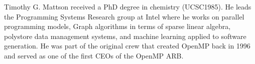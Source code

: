 \begin{IEEEbiography}{Timothy G. Mattson}
received a PhD degree in chemistry (UCSC1985). 
He leads the Programming Systems Research group at Intel
where he works on parallel programming models,
Graph algorithms in terms of  sparse linear algebra, polystore data management systems,
and machine learning applied to software generation. 
He was part of the original crew that created OpenMP back in 1996
and served as one of the first CEOs of the OpenMP ARB.   
\end{IEEEbiography}

